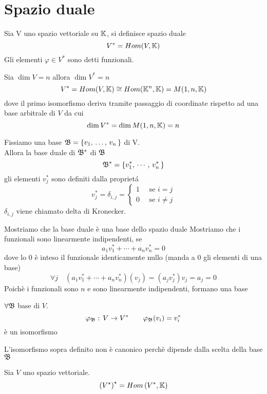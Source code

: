 \section{Spazio duale}
\begin{defn}
Sia V uno spazio vettoriale su $\mathbb{K}$, si definisce spazio duale
$$ V ^ * = Hom(V,\mathbb{K}) $$
Gli elementi $\varphi \in V^*$ sono detti funzionali.
\end{defn}
\begin{prop} Sia $\dim V= n $ allora $\dim V^*=n $
$$ V^*=Hom(V,\mathbb{K}) \cong Hom(\mathbb{K}^n,\mathbb{K}) = M(1,n,\mathbb{K})$$
dove il primo isomorfismo deriva tramite passaggio di coordinate rispetto ad una base arbitrale di $V$ da cui 
$$\dim V^*=\dim M(1,n,\mathbb{K})=n$$
\endproof
\end{prop}
\begin{defn}\bianco
Fissiamo una base $\mathfrak{B}=\{ v_1, \, \dots , \, v_n \, \} $ di V.\\
Allora la base duale di $\mathfrak{B}^*$ di $\mathfrak{B}$  
$$ \mathfrak{B}^*=\{ v_1^*, \, \cdots \, , \, v_n^* \, \} $$ 
gli elementi $v_j^*$ sono definiti dalla propriet\'a
$$ v_j ^*=\delta_{i,j}= \begin{cases} 1 \quad \text{ se } i=j \\
0 \quad \text{ se } i \neq j
\end{cases}$$
$\delta_{i,j} $ viene chiamato delta di Kronecker.
\end{defn}
\begin{prop} Mostriamo che la base duale \`e una base dello spazio duale
\proof Mostriamo che i funzionali sono linearmente indipendenti, se 
$$ a_1 v_1^*+ \cdots + a_n v_n ^* =0 $$
dove lo $0$ \`e inteso il funzionale identicamente nullo (manda a 0 gli elementi di una base)
$$ \forall j \quad ( a_1 v_1^*+ \cdots + a_n v_n ^* )(v_j)=(a_j v_j^*)v_j=a_j=0$$
Poich\`e i funzionali sono $n$ e sono linearmente indipendenti, formano una base
\endproof
\end{prop}
\label{isoDuale}
\begin{cor} $\forall \mathfrak{B} $ base di $V$.
$$ \varphi_{\mathfrak{B}} : \, V \to V^* \qquad \varphi_{\mathfrak{B}}(v_i)=v_i^*$$
\`e un isomorfismo

\begin{oss} L'isomorfismo sopra definito non \`e canonico perch\`e dipende dalla scelta della base $\mathfrak{B}$
\end{oss}
\end{cor}
\spazio
\begin{defn}[Bi-duale]\bianco 
Sia $V$ uno spazio vettoriale.
$$\left( V^\star \right)^\star =Hom \left( V^*,\mathbb{K} \right) $$
\end{defn}
